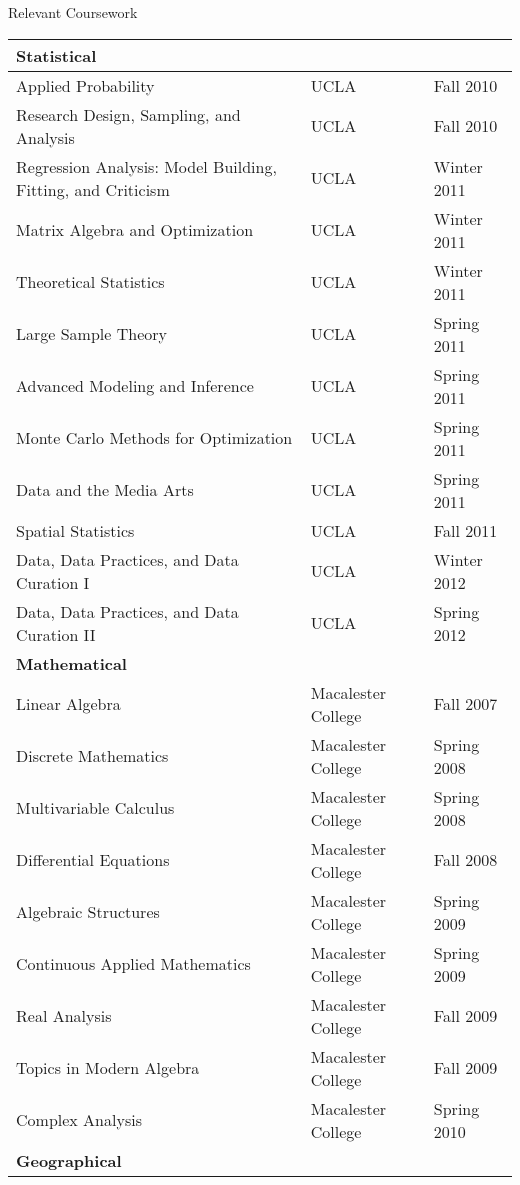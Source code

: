 \documentclass{resume} %
\begin{document}
\begin{rSection}{Relevant Coursework}
\begin{tabular}[c]{ lll}
\multicolumn{3}{l}{\bf Statistical} \rule{0pt}{4ex}\\
\hline
 Applied Probability & UCLA & Fall 2010  \\
Research Design, Sampling, and Analysis & UCLA & Fall 2010  \\
Regression Analysis: Model Building, Fitting, and Criticism & UCLA & Winter 2011  \\
Matrix Algebra and Optimization & UCLA & Winter 2011 \\
Theoretical Statistics & UCLA & Winter 2011 \\
Large Sample Theory & UCLA & Spring 2011  \\
Advanced Modeling and Inference & UCLA & Spring 2011  \\
Monte Carlo Methods for Optimization & UCLA & Spring 2011  \\
Data and the Media Arts & UCLA & Spring 2011  \\
Spatial Statistics & UCLA & Fall 2011  \\
Data, Data Practices, and Data Curation I & UCLA & Winter 2012  \\
Data, Data Practices, and Data Curation II & UCLA & Spring 2012  \\
\multicolumn{3}{l}{\bf Mathematical} \rule{0pt}{4ex} \\
\hline
Linear Algebra & Macalester College & Fall 2007   \\
Discrete Mathematics & Macalester College & Spring 2008  \\
Multivariable Calculus & Macalester College & Spring 2008  \\
Differential Equations & Macalester College & Fall 2008 \\
Algebraic Structures & Macalester College & Spring 2009  \\
Continuous Applied Mathematics & Macalester College & Spring 2009  \\
Real Analysis & Macalester College & Fall 2009  \\
Topics in Modern Algebra & Macalester College & Fall 2009  \\
Complex Analysis & Macalester College & Spring 2010  \\
\multicolumn{3}{l}{\bf Geographical} \rule{0pt}{4ex}\\

\end{tabular}
\end{rSection}
\end{document}
